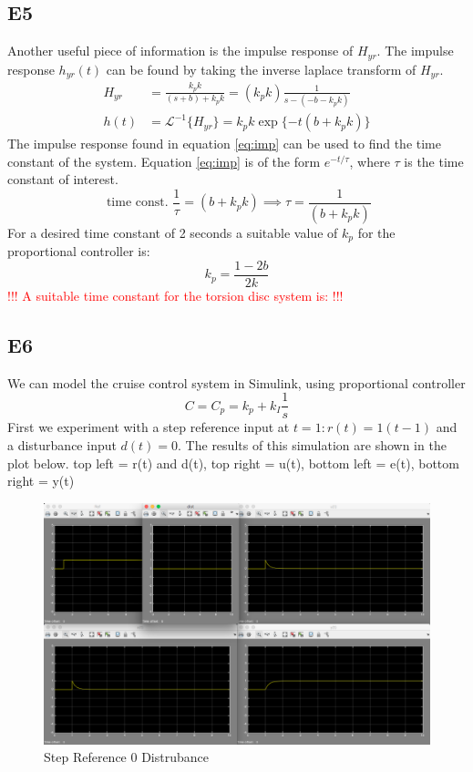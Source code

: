 \documentclass[10pt,titlepage]{article}
\begin{document}
	\subsection*{E5}
		Another useful piece of information is the impulse response of $H_{yr}$. The impulse response $h_{yr}(t)$ can be found by taking the inverse laplace transform of $H_{yr}$.
		\begin{align}
			H_{yr}&=\frac{k_pk}{(s+b)+k_pk}=(k_pk)\frac{1}{s-(-b-k_pk)} \\
			h(t)&=\mathcal{L}^{-1}\{H_{yr}\} = k_pk\exp\{{-t(b+k_pk)}\} \label{eq:imp}
		\end{align} 		
		The impulse response found in equation \ref{eq:imp} can be used to find the time constant of the system. Equation \ref{eq:imp} is of the form $e^{-t/\tau}$, where $\tau$ is the time constant of interest. 
		\begin{equation} \label{eq:tconst}
			\mbox{ time const. }\frac{1}{\tau}=(b+k_pk)\implies \tau=\frac{1}{(b+k_pk)}
		\end{equation}
		For a desired time constant of 2 seconds a suitable value of $k_p$ for the proportional controller is:
		\begin{equation} \label{eq:2stau}
			k_p=\frac{1-2b}{2k}
		\end{equation}
		\textcolor{red}{!!! A suitable time constant for the torsion disc system is: !!!}

	\subsection*{E6}
		We can model the cruise control system in Simulink, using proportional controller $$C=C_p=k_p+k_I\frac{1}{s}$$ First we experiment with a step reference input at $t=1: r(t)=1(t-1)$ and a disturbance input $d(t)=0$. The results of this simulation are shown in the plot below. top left = r(t) and d(t), top right = u(t), bottom left = e(t), bottom right = y(t)
		\begin{figure}[H]
			\centering
			\includegraphics[scale=0.3]{e6-1}
			\caption{Step Reference 0 Distrubance}
		\end{figure}
		
\end{document}
